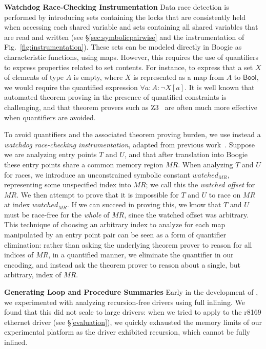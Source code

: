 \noindent\textbf{Watchdog Race-Checking Instrumentation }
%
Data race detection is performed by introducing sets containing the locks that are consistently held when accessing each shared variable and sets containing all shared variables that are read and written (see \S\ref{sec:symbolicpairwise} and the instrumentation of Fig.~\ref{fig:instrumentation}). These sets can be modeled directly in Boogie as characteristic functions, using maps. However, this requires the use of quantifiers to express properties related to set contents.  For instance, to express that a set $X$ of elements of type $A$ is empty, where $X$ is represented as a map from $A$ to $\mathsf{Bool}$, we would require the quantified expression $\forall a : A : \neg X[a]$.  It is well known that automated theorem proving in the presence of quantified constraints is challenging, and that theorem provers such as Z3~\cite{de2008z3} are often much more effective when quantifiers are avoided.  

To avoid quantifiers and the associated theorem proving burden, we use instead a \emph{watchdog race-checking instrumentation}, adapted from previous work~\cite{bardsley2014engineering}.  Suppose we are analyzing entry points $T$ and $U$, and that after translation into Boogie these entry points share a common memory region $\mathit{MR}$.  When analyzing $T$ and $U$ for races, we introduce an unconstrained symbolic constant $\mathit{watched}_{\mathit{MR}}$, representing some unspecified index into $\mathit{MR}$; we call this the \emph{watched offset} for $\mathit{MR}$.  We then attempt to prove that it is impossible for $T$ and $U$ to race on $\mathit{MR}$ at index $\mathit{watched}_{\mathit{MR}}$.  If we can succeed in proving this, we know that $T$ and $U$ must be race-free for the \emph{whole} of $\mathit{MR}$, since the watched offset was arbitrary.  This technique of choosing an arbitrary index to analyze for each map manipulated by an entry point pair can be seen as a form of quantifier elimination: rather than asking the underlying theorem prover to reason for all indices of $\mathit{MR}$, in a quantified manner, we eliminate the quantifier in our encoding, and instead ask the theorem prover to reason about a single, but arbitrary, index of $\mathit{MR}$.

\noindent\textbf{Generating Loop and Procedure Summaries }
%
Early in the development of \whoop, we experimented with analyzing recursion-free drivers using full inlining.  We found that this did not scale to large drivers: when we tried to apply \whoop to the r8169 ethernet driver (see \S\ref{evaluation}), we quickly exhausted the memory limits of our experimental platform as the driver exhibited recursion, which cannot be fully inlined.

